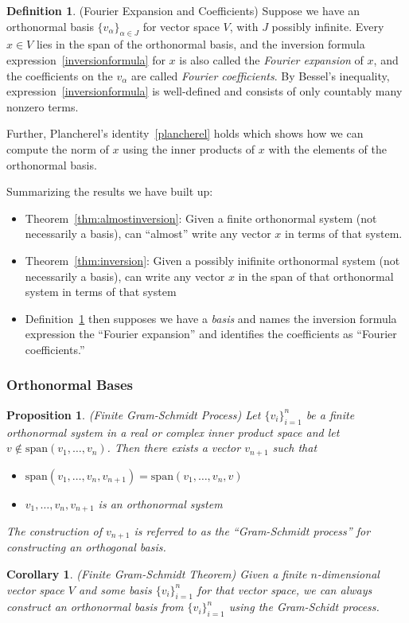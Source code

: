 \documentclass[12pt]{book}
\numberwithin{equation}{section} %
\theoremstyle{plain}
\newtheorem{prop}[thm]{Proposition}
\newtheorem{cor}[thm]{Corollary}
\theoremstyle{definition}
\newtheorem{defn}[thm]{Definition}
\theoremstyle{remark}
\begin{document}
\begin{defn}
(Fourier Expansion and Coefficients)
\label{defn:fourier}
Suppose we have an orthonormal basis $\{v_\alpha\}_{\alpha\in J}$ for
vector space $V$, with $J$ possibly infinite.
Every $x\in V$ lies in the span of the orthonormal basis,
and the inversion formula expression~\ref{inversionformula} for $x$ is
also called the \emph{Fourier expansion} of $x$, and the coefficients on
the $v_\alpha$ are called \emph{Fourier coefficients}.
By Bessel's inequality, expression~\ref{inversionformula} is
well-defined and consists of only countably many nonzero terms.

Further, Plancherel's identity~\ref{plancherel} holds which shows how we can
compute the norm of $x$ using the inner products of $x$ with the
elements of the orthonormal basis.
\end{defn}

Summarizing the results we have built up:
\begin{itemize}
  \item
    Theorem~\ref{thm:almostinversion}:
    Given a finite orthonormal system (not necessarily a basis), can
    ``almost'' write any vector $x$ in terms of that system.
  \item
    Theorem~\ref{thm:inversion}:
    Given a possibly inifinite orthonormal system (not necessarily a
    basis), can write any vector $x$ in the span of that orthonormal
    system in terms of that system
  \item
    Definition~\ref{defn:fourier} then supposes we have a \emph{basis}
    and names the inversion formula expression the ``Fourier expansion''
    and identifies the coefficients as ``Fourier coefficients.''
\end{itemize}


\clearpage
\subsubsection{Orthonormal Bases}


\begin{prop}
\emph{(Finite Gram-Schmidt Process)}
Let $\{v_i\}_{i=1}^n$ be a finite orthonormal system in a real or
complex inner product space and let
$v\not\in \text{span}(v_1,\ldots,v_n)$.
Then there exists a vector $v_{n+1}$ such that
\begin{itemize}
  \item
    $\text{span}(v_1,\ldots,v_n,v_{n+1})=\text{span}(v_1,\ldots,v_n,v)$
  \item $v_1,\ldots,v_n,v_{n+1}$ is an orthonormal system
\end{itemize}
The construction of $v_{n+1}$ is referred to as the ``Gram-Schmidt
process'' for constructing an orthogonal basis.
\end{prop}
\begin{cor}
\emph{(Finite Gram-Schmidt Theorem)}
Given a finite $n$-dimensional vector space $V$ and some basis
$\{v_i\}_{i=1}^n$ for that vector space, we can always construct an
orthonormal basis from $\{v_i\}_{i=1}^n$ using the Gram-Schidt process.
\end{cor}
\end{document}
